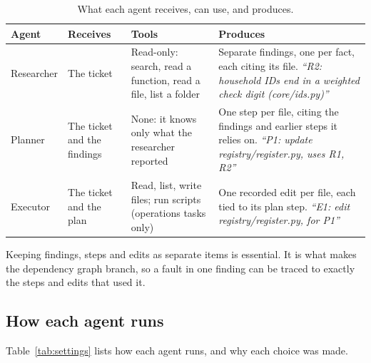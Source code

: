 \documentclass{article}
\begin{document}
\begin{table}[htbp]
\centering
\small
\caption{What each agent receives, can use, and produces.}
\label{tab:roles}
\begin{tabularx}{\linewidth}{@{}lLLL@{}}
\toprule
Agent & Receives & Tools & Produces \\
\midrule
Researcher & The ticket & Read-only: search, read a function, read a file, list a folder & Separate findings, one per fact, each citing its file. \emph{``R2: household IDs end in a weighted check digit (core/ids.py)''} \\
Planner & The ticket and the findings & None: it knows only what the researcher reported & One step per file, citing the findings and earlier steps it relies on. \emph{``P1: update registry/register.py, uses R1, R2''} \\
Executor & The ticket and the plan & Read, list, write files; run scripts (operations tasks only) & One recorded edit per file, each tied to its plan step. \emph{``E1: edit registry/register.py, for P1''} \\
\bottomrule
\end{tabularx}
\end{table}

Keeping findings, steps and edits as separate items is essential. It is what makes the dependency graph branch, so a fault in one finding can be traced to exactly the steps and edits that used it.

\subsection{How each agent runs}

Table~\ref{tab:settings} lists how each agent runs, and why each choice was made.
\end{document}
